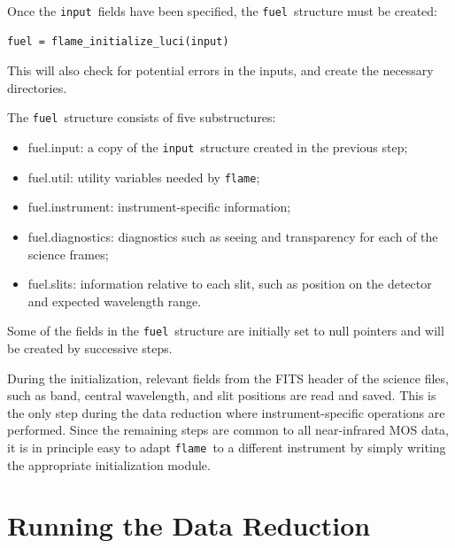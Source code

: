 \documentclass[a4paper, notitlepage]{article}
\newcommand{\flame}{\texttt{flame}}
\newcommand{\fuel}{\texttt{fuel}}
\newcommand{\inp}{\texttt{input}}
\begin{document}
Once the \inp\ fields have been specified, the \fuel\ structure must be created:
\begin{lstlisting}
fuel = flame_initialize_luci(input)
\end{lstlisting}
This will also check for potential errors in the inputs, and create the necessary directories.

The \fuel\ structure consists of five substructures:
\begin{itemize}
	\item fuel.input: a copy of the \inp\ structure created in the previous step;
	\item fuel.util: utility variables needed by \flame;
	\item fuel.instrument: instrument-specific information;
	\item fuel.diagnostics: diagnostics such as seeing and transparency for each of the science frames;
	\item fuel.slits: information relative to each slit, such as position on the detector and expected wavelength range.
\end{itemize}

Some of the fields in the \fuel\ structure are initially set to null pointers and will be created by successive steps.

During the initialization, relevant fields from the FITS header of the science files, such as band, central wavelength, and slit positions are read and saved. This is the only step during the data reduction where instrument-specific operations are performed. Since the remaining steps are common to all near-infrared MOS data, it is in principle easy to adapt \flame\ to a different instrument by simply writing the appropriate initialization module.








\section{Running the Data Reduction}
\end{document}
